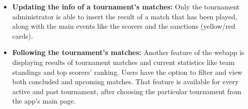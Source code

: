 \begin{itemize}
    \item \textbf{Updating the info of a tournament's matches:}
        Only the tournament administrator is able to insert the result of a match that has been played,
        along with the main events like the scorers and the sanctions (yellow/red cards).
        
    \item \textbf{Following the tournament's matches:}
        Another feature of the webapp is displaying results of tournament matches and current statistics
        like team standings and top scorers' ranking. Users have the option to filter and view
        both concluded and upcoming matches. That feature is available for every active and past
        tournament, after choosing the particular tournament from the app's main page.

\end{itemize}
\newpage
